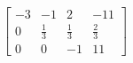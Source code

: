 \documentclass[preview]{standalone}
\begin{document}
\begin{align*}
\left[\begin{array}{ccc|c}-3 & -1 & 2 & -11 \\0 & \frac{1}{3} & \frac{1}{3} & \frac{2}{3} \\0 & 0 & -1 & 11\end{array}\right]
\end{align*}
\end{document}
